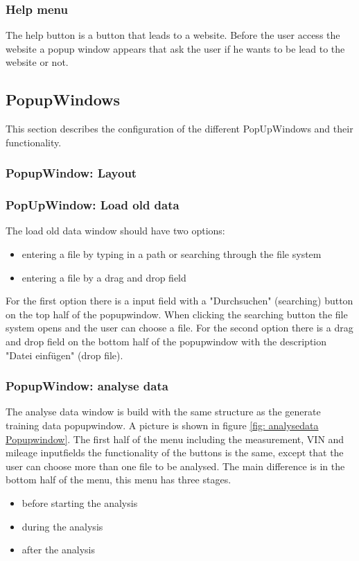 \documentclass{scrreprt}
\begin{document}
\subsubsection{Help menu}

The help button is a button that leads to a website. Before the user access the website a popup window appears that ask the user if he wants to be lead to the website or not. 



\subsection{PopupWindows}
This section describes the configuration of the different PopUpWindows and their functionality.

\subsubsection{PopupWindow: Layout}\label{cap: PopupWindow_layout}


\subsubsection{PopUpWindow: Load old data}\label{cap: PopupWindow_loadoldata}
The load old data window should have two options: 
\begin{itemize}
    \item entering a file by typing in a path or searching through the file system
    \item entering a file by a drag and drop field 
\end{itemize}
For the first option there is a input field with a "Durchsuchen" (searching) button on the top half of the popupwindow. When clicking the searching button the file system opens and the user can choose a file.
For the second option there is a drag and drop field on the bottom half of the popupwindow with the description "Datei einfügen" (drop file). 


\subsubsection{PopupWindow: analyse data}\label{cap: PopupWindow_analysedata}

The analyse data window is build with the same structure as the generate training data popupwindow. A picture is shown in figure \ref{fig: analysedata Popupwindow}. 
The first half of the menu including the measurement, VIN and mileage inputfields the functionality of the buttons is the same, except that the user can choose more than one file to be analysed. The main difference is in the bottom half of the menu, this menu has three stages. 
\begin{itemize}
    \item before starting the analysis 
    \item during the analysis
    \item after the analysis
\end{itemize}
\end{document}
